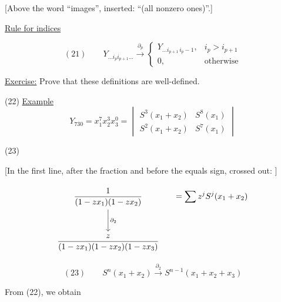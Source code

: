 [Above the word ``images'', inserted: ``(all nonzero ones)''.]

\underline{Rule for  indices}

\begin{equation*}
(21)\qquad
Y_{\ldots i_p i_{p+1}\ldots}
\overset{\partial_p}{\longrightarrow}
\begin{cases}
Y_{\ldots i_{p+1}\,i_p-1},&i_p>i_{p+1}\\
0,&\text{otherwise}
\end{cases}
\end{equation*}

\underline{Exercise:} Prove that these definitions are well-defined.

(22) \underline{Example}
\begin{equation*}
Y_{730}=x_1^7x_2^3x_3^0=
\begin{vmatrix}
S^3(x_1+x_2)&S^8(x_1)\\
S^2(x_1+x_2)&S^7(x_1)
\end{vmatrix}
\end{equation*}



(23)

[In the first line, after the fraction and before the equals sign, crossed out:
]

\begin{equation*}
\begin{tikzcd}[column sep=small,row sep=large]
{\displaystyle\frac{1}{(1-zx_1)(1-zx_2)}}\arrow[d,"\partial_2"]
& {=\displaystyle\sum z^j S^j(x_1+x_2)}\\
{\displaystyle\frac{z}{(1-zx_1)(1-zx_2)(1-zx_3)}} &
\end{tikzcd}
\end{equation*}

\begin{equation*}
(23)\qquad
S^n(x_1+x_2)\overset{\partial_2}{\longrightarrow}
S^{n-1}(x_1+x_2+x_3)
\end{equation*}

From (22), we obtain

